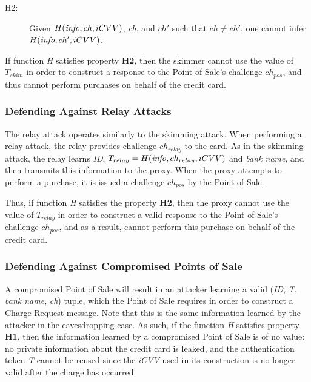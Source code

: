 \begin{description}
\item[H2:] Given $H(\textrm{\emph{info}}, ch, iCVV)$, \emph{ch}, and $ch'$ such that $ch \neq ch'$, one cannot infer $H(\textrm{\emph{info}}, ch', iCVV)$.
\end{description}

If function \emph{H} satisfies property \textbf{H2}, then the skimmer cannot use the value of $T_{skim}$ in order to construct a response to the Point of Sale's challenge $ch_{pos}$, and thus cannot perform purchases on behalf of the credit card.






\subsubsection*{Defending Against Relay Attacks}
The relay attack operates similarly to the skimming attack.
When performing a relay attack, the relay provides challenge $ch_{relay}$ to the card.
As in the skimming attack, the relay learns \emph{ID}, $T_{relay} = H(\textrm{\emph{info}}, ch_{relay}, iCVV)$ and \emph{bank name}, and then transmits this information to the proxy.
When the proxy attempts to perform a purchase, it is issued a challenge $ch_{pos}$ by the Point of Sale.

Thus, if function \emph{H} satisfies the property \textbf{H2},
	then the proxy cannot use the value of $T_{relay}$ in order to construct a valid response to the Point of Sale's challenge $ch_{pos}$,
	and as a result, cannot perform this purchase on behalf of the credit card.






\subsubsection*{Defending Against Compromised Points of Sale}
A compromised Point of Sale will result in an attacker learning a valid (\emph{ID}, \emph{T}, \emph{bank name}, \emph{ch}) tuple,
	which the Point of Sale requires in order to construct a Charge Request message.
Note that this is the same information learned by the attacker in the eavesdropping case.
As such, if the function \emph{H} satisfies property \textbf{H1}, then the information learned by a compromised Point of Sale is of no value:
	no private information about the credit card is leaked,
	and the authentication token \emph{T} cannot be reused since the \emph{iCVV} used in its construction is no longer valid after the charge has occurred.




